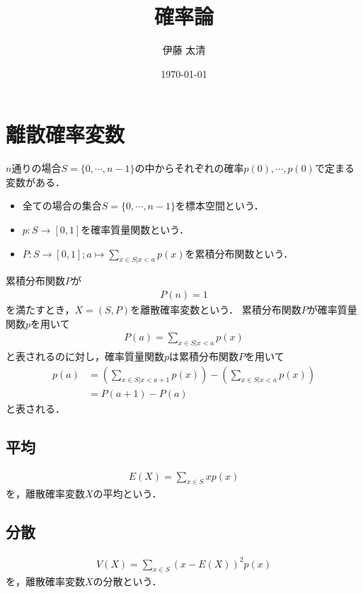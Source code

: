 \documentclass[dvipdfmx]{jsarticle}
\title{確率論}
\author{伊藤 太清}
\date{\today}
\begin{document}
 \maketitle
 \section{離散確率変数}
$n$通りの場合$S=\{0,\cdots,n-1\}$の中からそれぞれの確率$p\left(0\right),\cdots,p\left(0\right)$で定まる変数がある．
 \begin{itemize}
  \item 全ての場合の集合$S=\{0,\cdots,n-1\}$を標本空間という．
  \item $p:S\to\left[0,1\right]$を確率質量関数という．
  \item $P:S\to\left[0,1\right];a\mapsto\sum_{x\in S|x<a}p\left(x\right)$を累積分布関数という．
 \end{itemize}
累積分布関数$P$が
 \begin{align}
P\left(n\right)=1
 \end{align}
を満たすとき，$X=\left(S,P\right)$を離散確率変数という．
累積分布関数$P$が確率質量関数$p$を用いて
 \begin{align}
P\left(a\right)=\sum_{x\in S|x<a}p\left(x\right)
 \end{align}
と表されるのに対し，確率質量関数$p$は累積分布関数$P$を用いて
 \begin{align}
p\left(a\right)&=\left(\sum_{x\in S|x<a+1}p\left(x\right)\right)-\left(\sum_{x\in S|x<a}p\left(x\right)\right)\nonumber\\
&=P\left(a+1\right)-P\left(a\right)
 \end{align}
と表される．
 \subsection{平均}
 \begin{align}
E\left(X\right)=\sum_{x\in S}xp\left(x\right)
 \end{align}
を，離散確率変数$X$の平均という．
 \subsection{分散}
 \begin{align}
V\left(X\right)=\sum_{x\in S}\left(x-E\left(X\right)\right)^2p\left(x\right)
 \end{align}
を，離散確率変数$X$の分散という．
\end{document}
